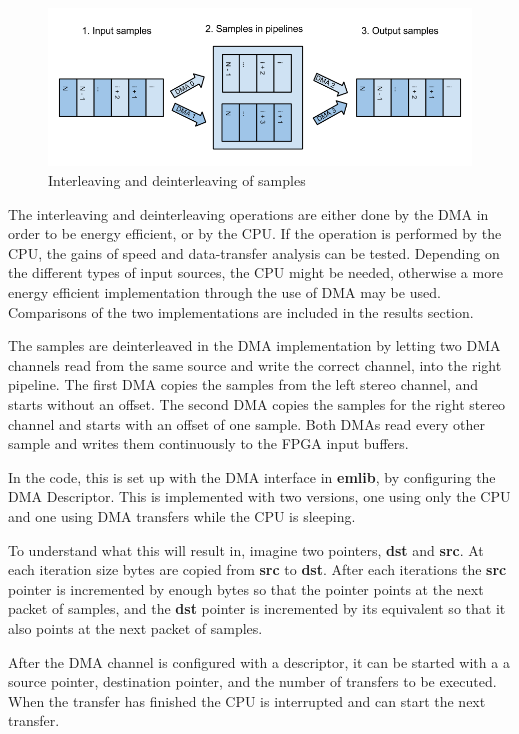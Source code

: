 \begin{figure}[H]
    \centering
    \includegraphics[width=1\textwidth]{figures/sw/interleaving-of-samples.png}
    \caption{Interleaving and deinterleaving of samples}
    \label{fig:interleaving}
\end{figure}

The interleaving and deinterleaving operations are either done by the DMA in order
to be energy efficient, or by the CPU. If the operation is performed by the
CPU, the gains of speed and data-transfer analysis can be tested. Depending on
the different types of input sources, the CPU might be needed, otherwise a
more energy efficient implementation through the use of DMA may be used.
Comparisons of the two implementations are included in the results section.

The samples are deinterleaved in the DMA implementation by letting two DMA
channels read from the same source and write the correct channel, into the
right pipeline. The first DMA copies the samples from
the left stereo channel, and starts without an offset. The second DMA copies the
samples for the right stereo channel and starts with an offset of one sample.
Both DMAs read every other sample and writes them continuously to the FPGA input
buffers.

In the code, this is set up with the DMA interface in {\bf emlib}, by
configuring the DMA Descriptor. This is implemented with two
versions, one using only the CPU and one using DMA transfers while the CPU is
sleeping.

To understand what this will result in, imagine two pointers, {\bf dst} and {\bf
src}. At each iteration size bytes are copied from {\bf src} to {\bf dst}. After
each iterations the {\bf src} pointer is incremented by enough bytes so that the
pointer points at the next packet of samples, and the {\bf dst} pointer is
incremented by its equivalent so that it also points at the next packet of
samples.

After the DMA channel is configured with a descriptor, it can be started with a
a source pointer, destination pointer, and the number of transfers to be
executed. When the transfer has finished the CPU is interrupted and can start
the next transfer.


